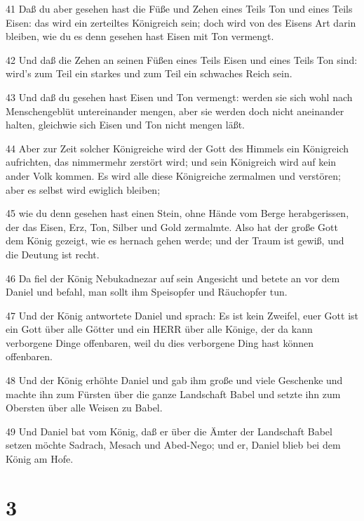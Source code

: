 \par 41 Daß du aber gesehen hast die Füße und Zehen eines Teils Ton und eines Teils Eisen: das wird ein zerteiltes Königreich sein; doch wird von des Eisens Art darin bleiben, wie du es denn gesehen hast Eisen mit Ton vermengt.
\par 42 Und daß die Zehen an seinen Füßen eines Teils Eisen und eines Teils Ton sind: wird's zum Teil ein starkes und zum Teil ein schwaches Reich sein.
\par 43 Und daß du gesehen hast Eisen und Ton vermengt: werden sie sich wohl nach Menschengeblüt untereinander mengen, aber sie werden doch nicht aneinander halten, gleichwie sich Eisen und Ton nicht mengen läßt.
\par 44 Aber zur Zeit solcher Königreiche wird der Gott des Himmels ein Königreich aufrichten, das nimmermehr zerstört wird; und sein Königreich wird auf kein ander Volk kommen. Es wird alle diese Königreiche zermalmen und verstören; aber es selbst wird ewiglich bleiben;
\par 45 wie du denn gesehen hast einen Stein, ohne Hände vom Berge herabgerissen, der das Eisen, Erz, Ton, Silber und Gold zermalmte. Also hat der große Gott dem König gezeigt, wie es hernach gehen werde; und der Traum ist gewiß, und die Deutung ist recht.
\par 46 Da fiel der König Nebukadnezar auf sein Angesicht und betete an vor dem Daniel und befahl, man sollt ihm Speisopfer und Räuchopfer tun.
\par 47 Und der König antwortete Daniel und sprach: Es ist kein Zweifel, euer Gott ist ein Gott über alle Götter und ein HERR über alle Könige, der da kann verborgene Dinge offenbaren, weil du dies verborgene Ding hast können offenbaren.
\par 48 Und der König erhöhte Daniel und gab ihm große und viele Geschenke und machte ihn zum Fürsten über die ganze Landschaft Babel und setzte ihn zum Obersten über alle Weisen zu Babel.
\par 49 Und Daniel bat vom König, daß er über die Ämter der Landschaft Babel setzen möchte Sadrach, Mesach und Abed-Nego; und er, Daniel blieb bei dem König am Hofe.

\chapter{3}

